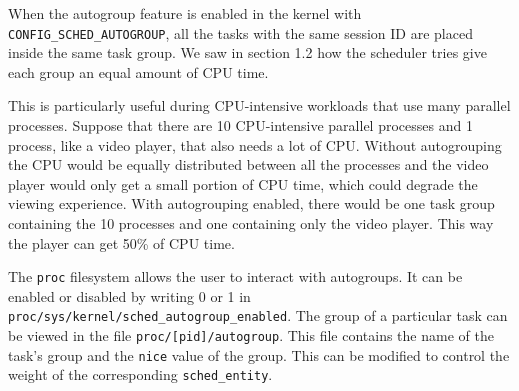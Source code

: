 When the autogroup feature is enabled in the kernel with \newline \verb|CONFIG_SCHED_AUTOGROUP|, all the tasks with the same session ID are placed inside the same task group. We saw in section 1.2 how the scheduler tries give each group an equal amount of CPU time.

This is particularly useful during CPU-intensive workloads that use many parallel processes. Suppose that there are 10 CPU-intensive parallel processes and 1 process, like a video player, that also needs a lot of CPU. Without autogrouping the CPU would be equally distributed between all the processes and  the video player would only get a small portion of CPU time, which could degrade the viewing experience. With autogrouping enabled, there would be one task group containing the 10 processes and one containing only the video player. This way the player can get 50\% of CPU time.

The \verb|proc| filesystem allows the user to interact with autogroups. It can be enabled or disabled by writing 0 or 1 in \verb|proc/sys/kernel/sched_autogroup_enabled|.  The group of a particular task can be viewed in the file \verb|proc/[pid]/autogroup|. This file contains the name of the task's group and the \verb|nice| value of the group. This can be modified to control the weight of the corresponding \verb|sched_entity|.


